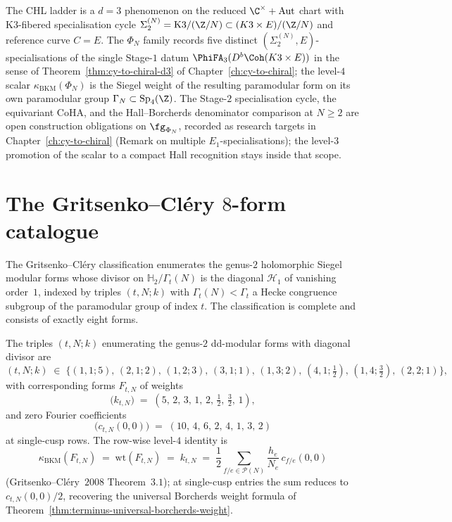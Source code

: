 \begin{remark}[CHL slice as $d = 3$ K3-fibered chart-specialisation]
\label{rem:terminus-chl-d3-chart}
The CHL ladder is a $d = 3$ phenomenon on the reduced
$\C^\times + \mathrm{Aut}$ chart with K3-fibered specialisation
cycle $\Sigma_2^{(N)} = \mathrm{K3}/(\Z/N) \subset (K3 \times
E)/(\Z/N)$ and reference curve $C = E$.  The $\Phi_N$ family
records five distinct
$(\Sigma_2^{(N)}, E)$-specialisations of the single Stage-$1$ datum
$\PhiFA_3(D^b\Coh(K3 \times E))$ in the sense of
Theorem~\ref{thm:cy-to-chiral-d3} of Chapter~\ref{ch:cy-to-chiral};
the level-$4$ scalar $\kappa_{\mathrm{BKM}}(\Phi_N)$ is the Siegel
weight of the resulting paramodular form on its own paramodular
group $\Gamma_N \subset \mathrm{Sp}_4(\Z)$.  The Stage-$2$
specialisation cycle, the equivariant CoHA, and the Hall--Borcherds
denominator comparison at $N \ge 2$ are open construction
obligations on $\fg_{\Phi_N}$, recorded as research targets in
Chapter~\ref{ch:cy-to-chiral} (Remark on multiple
$E_1$-specialisations); the level-$3$ promotion of the scalar to a
compact Hall recognition stays inside that scope.
\end{remark}

\section{The Gritsenko--Cl\'ery $8$-form catalogue}
\label{sec:terminus-gc-catalogue}

The Gritsenko--Cl\'ery classification \cite[Theorem~1.4]{GritsenkoClery2008}
enumerates the genus-$2$ holomorphic Siegel modular forms whose divisor
on $\mathbb H_2 / \Gamma_t(N)$ is the diagonal $\mathcal H_1$ of
vanishing order~$1$, indexed by triples $(t, N; k)$ with
$\Gamma_t(N) < \Gamma_t$ a Hecke congruence subgroup of the paramodular
group of index $t$.  The classification is complete and consists of
exactly eight forms.

\begin{theorem}
\label{thm:terminus-gc-catalogue}
The triples $(t, N; k)$ enumerating the genus-$2$ dd-modular forms
with diagonal divisor are
\[
 (t, N; k) \;\in\; \bigl\{(1, 1; 5),\, (2, 1; 2),\, (1, 2; 3),\,
 (3, 1; 1),\, (1, 3; 2),\, (4, 1; \tfrac12),\, (1, 4; \tfrac32),\,
 (2, 2; 1)\bigr\},
\]
with corresponding forms $F_{t, N}$ of weights
\[
 \bigl(k_{t, N}\bigr) \;=\; (5,\, 2,\, 3,\, 1,\, 2,\, \tfrac12,\,
 \tfrac32,\, 1),
\]
and zero Fourier coefficients
\[
 \bigl(c_{t, N}(0, 0)\bigr) \;=\; (10,\, 4,\, 6,\, 2,\, 4,\, 1,\,
 3,\, 2)
\]
at single-cusp rows.  The row-wise level-$4$ identity is
\[
 \kappa_{\mathrm{BKM}}(F_{t, N}) \;=\; \mathrm{wt}(F_{t, N}) \;=\;
 k_{t, N} \;=\; \frac{1}{2} \sum_{f/e \in \mathcal P(N)}
 \frac{h_e}{N_e}\, c_{f/e}(0, 0)
\]
\textup{(}Gritsenko--Cl\'ery~$2008$ Theorem~$3.1$\textup{)}; at
single-cusp entries the sum reduces to $c_{t, N}(0, 0)/2$, recovering
the universal Borcherds weight formula of
Theorem~\ref{thm:terminus-universal-borcherds-weight}.
\end{theorem}


